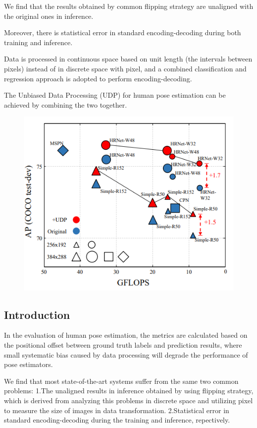 \documentclass[11pt]{article}
\begin{document}
We find that the results obtained by common flipping strategy are unaligned with the original ones in inference.

Moreover, there is statistical error in standard encoding-decoding during both training and inference.

Data is processed in continuous space based on unit length (the intervals between pixels) instead of in discrete space with pixel, and a combined classification and regression approach is adopted to
perform encoding-decoding.

The Unbiased Data Processing (UDP) for human pose estimation can be achieved by combining the two together.
\begin{figure}[H]
	\centering
	\includegraphics[scale=0.5]{23}
\end{figure}
\subsection{Introduction}
In the evaluation of human pose estimation, the metrics are calculated based on the positional offset between ground truth labels and prediction results, where small systematic bias caused by data processing will degrade the performance of pose estimators.

We find that most state-of-the-art systems suffer from the same two common problems:
\noindent 1.The unaligned results in inference obtained by using flipping strategy, which is derived from analyzing this problems in discrete space and utilizing pixel to measure the size of images in data transformation.
\noindent 2.Statistical error in standard encoding-decoding during the training and inference, repectively.
\end{document}
